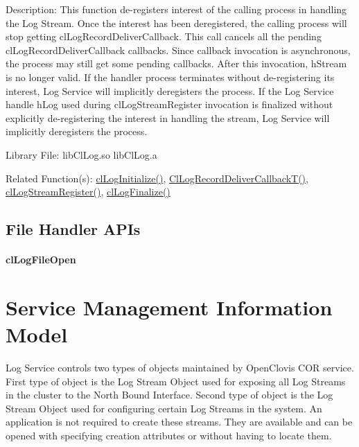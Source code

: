 \begin{flushleft}
\begin{Desc}
\end{Desc}
\begin{Desc}
\item[Description:] This function de-registers interest of the calling process in handling the Log Stream. Once the interest has been deregistered, 
the calling process will stop getting clLogRecordDeliverCallback. This call cancels all the pending clLogRecordDeliverCallback callbacks. Since 
callback invocation is asynchronous, the process may still get some pending callbacks. After this invocation, hStream is no longer valid. If the 
handler process terminates without de-registering its interest, Log Service will implicitly deregisters the process. If the Log Service handle hLog used 
during clLogStreamRegister invocation is finalized without explicitly de-registering the interest in handling the stream, Log Service will implicitly
deregisters the process.
\end{Desc}
\begin{Desc}
\item[Library File:] libClLog.so
\newline
libClLog.a
\end{Desc}
\begin{Desc}
\item[Related Function(s):]\hyperlink{pagelog101}{clLogInitialize()}, \hyperlink{pagelog113}{ClLogRecordDeliverCallbackT()},
\hyperlink{pagelog112}{clLogStreamRegister()}, \hyperlink{pagelog102}{clLogFinalize()}
\end{Desc}
\newpage


\section{File Handler APIs}
\subsubsection{clLogFileOpen}


\chapter{Service Management Information Model}
Log Service controls two types of objects maintained by OpenClovis COR service. First type of object is the Log Stream Object used for
exposing all Log Streams in the cluster to the North Bound Interface. Second type of object is the Log Stream Object used for configuring certain
Log Streams in the system. An application is not required to create these streams. They are available and can be 
opened with specifying creation attributes or without having to locate them.




\end{flushleft}
